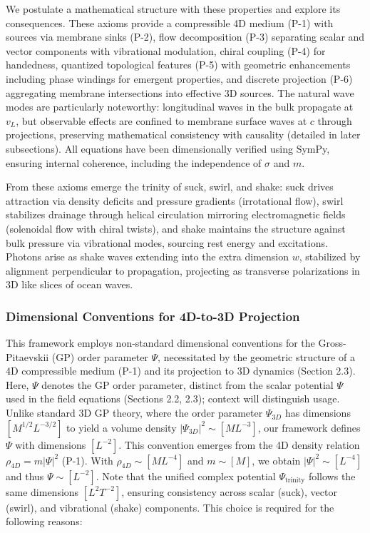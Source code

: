 We postulate a mathematical structure with these properties and explore its consequences. These axioms provide a compressible 4D medium (P-1) with sources via membrane sinks (P-2), flow decomposition (P-3) separating scalar and vector components with vibrational modulation, chiral coupling (P-4) for handedness, quantized topological features (P-5) with geometric enhancements including phase windings for emergent properties, and discrete projection (P-6) aggregating membrane intersections into effective 3D sources. The natural wave modes are particularly noteworthy: longitudinal waves in the bulk propagate at $v_L$, but observable effects are confined to membrane surface waves at $c$ through projections, preserving mathematical consistency with causality (detailed in later subsections). All equations have been dimensionally verified using SymPy, ensuring internal coherence, including the independence of $\sigma$ and $m$.

From these axioms emerge the trinity of suck, swirl, and shake: suck drives attraction via density deficits and pressure gradients (irrotational flow), swirl stabilizes drainage through helical circulation mirroring electromagnetic fields (solenoidal flow with chiral twists), and shake maintains the structure against bulk pressure via vibrational modes, sourcing rest energy and excitations. Photons arise as shake waves extending into the extra dimension $w$, stabilized by alignment perpendicular to propagation, projecting as transverse polarizations in 3D like slices of ocean waves.

\subsubsection{Dimensional Conventions for 4D-to-3D Projection}
\label{subsec:dimensional_conventions}

This framework employs non-standard dimensional conventions for the Gross-Pitaevskii (GP) order parameter $\Psi$, necessitated by the geometric structure of a 4D compressible medium (P-1) and its projection to 3D dynamics (Section 2.3). Here, $\Psi$ denotes the GP order parameter, distinct from the scalar potential $\Psi$ used in the field equations (Sections 2.2, 2.3); context will distinguish usage. Unlike standard 3D GP theory, where the order parameter $\Psi_{3D}$ has dimensions $[M^{1/2} L^{-3/2}]$ to yield a volume density $|\Psi_{3D}|^2 \sim [M L^{-3}]$, our framework defines $\Psi$ with dimensions $[L^{-2}]$. This convention emerges from the 4D density relation $\rho_{4D} = m |\Psi|^2$ (P-1). With $\rho_{4D} \sim [M L^{-4}]$ and $m \sim [M]$, we obtain $|\Psi|^2 \sim [L^{-4}]$ and thus $\Psi \sim [L^{-2}]$. Note that the unified complex potential $\Psi_{\text{trinity}}$ follows the same dimensions $[L^2 T^{-2}]$, ensuring consistency across scalar (suck), vector (swirl), and vibrational (shake) components. This choice is required for the following reasons:

